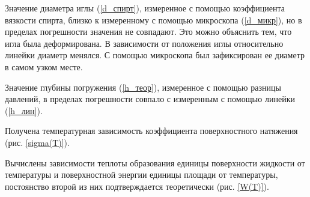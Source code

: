 \documentclass[a4paper,12pt]{article} %
\begin{document}
Значение диаметра иглы (\ref{d_спирт}), измеренное с помощью коэффициента вязкости спирта, близко к измеренному с помощью микроскопа (\ref{d_микр}), но в пределах погрешности значения не совпадают. Это можно объяснить тем, что игла была деформирована. В зависимости от положения иглы относительно линейки диаметр менялся. С помощью микроскопа был зафиксирован ее диаметр в самом узком месте.

Значение глубины погружения (\ref{h_теор}), измеренное с помощью разницы давлений, в пределах погрешности совпало с измеренным с помощью линейки (\ref{h_лин}).

Получена температурная зависимость коэффициента поверхностного натяжения (рис. \ref{sigma(T)}).

Вычислены зависимости теплоты образования единицы поверхности жидкости от температуры и поверхностной энергии единицы площади от температуры, постоянство второй из них подтверждается теоретически (рис. \ref{W(T)}).
\end{document}
